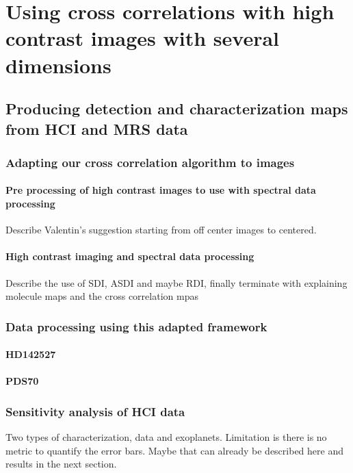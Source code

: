 \part{Using cross correlations with high contrast images with several dimensions}
\startcontents[chapters]
\printmyminitoc{
}



\chapter{Producing detection and characterization maps from HCI and MRS data}
\section{Adapting our cross correlation algorithm to images}
\subsection{Pre processing of high contrast images to use with spectral data processing}
Describe Valentin's suggestion starting from off center images to centered.
\subsection{High contrast imaging and spectral data processing}
Describe the use of SDI, ASDI and maybe RDI, finally terminate with explaining molecule maps and the cross correlation mpas
\section{Data processing using this adapted framework}
\subsection{HD142527}
\subsection{PDS70}
\section{Sensitivity analysis of HCI data}
Two types of characterization, data and exoplanets.
Limitation is there is no metric to quantify the error bars. Maybe that can already be described here and results in the next section.
